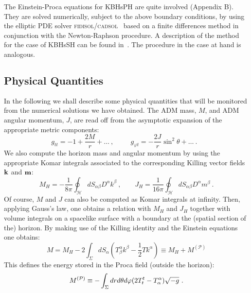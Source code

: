 \documentclass{article}
\numberwithin{equation}{section}
\begin{document}
The Einstein-Proca equations for KBHsPH are quite involved (Appendix B). They are solved numerically, subject to the above boundary conditions, by  using the elliptic PDE solver \textsc{fidisol/cadsol}~\cite{schoen} 
based on a finite differences method in conjunction with the Newton-Raphson procedure. 
A description of the method for the case of KBHsSH can be found in~\cite{Herdeiro:2015gia}. 
The procedure in the case at hand is analogous. 

 


\subsection{Physical Quantities}
\label{subsec_II}
In the following we shall describe some physical quantities that will be monitored from the numerical solutions we have obtained.  The ADM mass, $M$, and ADM angular momentum, $J$, are read off from the asymptotic expansion of the appropriate metric components:
%
\begin{equation}
\label{asym}
g_{tt} =-1+\frac{2M}{r}+\dots \ ,\qquad ~~g_{\varphi t}=-\frac{2J}{r}\sin^2\theta+\dots \ . \ \ \ 
\end{equation}
%
We also compute the horizon mass and angular momentum by using the appropriate Komar integrals associated to the corresponding Killing vector fields ${\bf k}$ and ${\bf m}$:
\begin{equation}
M_H=-\frac{1}{8\pi}\oint_{\mathcal{H}}dS_{\alpha\beta}D^\alpha k^\beta \ , \qquad 
J_H=\frac{1}{16\pi}\oint_{\mathcal{H}}dS_{\alpha\beta}D^\alpha m^\beta \ .
\end{equation}
%
%
Of course, $M$ and $J$ can also be computed as Komar integrals at infinity. Then, applying Gauss's law, one obtains a relation with $M_H$ and $J_H$ together with volume integrals on a spacelike surface with a boundary at the (spatial section of the) horizon. By making use of the Killing identity and the Einstein equations one obtains:
\begin{equation}
M=M_H-2\int_{\Sigma}dS_{\alpha}\left(T^\alpha_\beta k^\beta-\frac{1}{2}Tk^\alpha\right) \equiv M_H+M^{(\mathcal{P})}
\end{equation}
This defines the energy stored in the Proca field (outside the horizon):
\begin{equation}
M^{({\cal P})}\equiv - \int_{\Sigma} dr d\theta d\varphi(2T_t^t-T_\alpha^\alpha) \sqrt{-g} \ .
\label{ed}
\end{equation}
\end{document}
